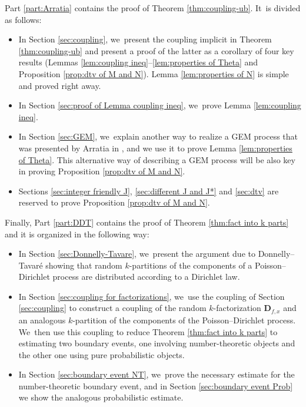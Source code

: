 \documentclass[JEP,XML,SOM,Unicode,published]{cedram}
\newcommand{\bD}{{\boldsymbol D}}
\theoremstyle{plain}
\theoremstyle{definition}
\begin{document}
Part \ref{part:Arratia} contains the proof of Theorem \ref{thm:coupling-ub}. It~is divided as follows:
\begin{itemize}
\item In Section \ref{sec:coupling}, we~present the coupling implicit in Theorem \ref{thm:coupling-ub} and present a proof of the latter as a corollary of four key results (Lemmas \ref{lem:coupling ineq}--\ref{lem:properties of Theta} and Proposition \ref{prop:dtv of M and N}). Lemma \ref{lem:properties of N} is simple and proved right away.

\item In Section \ref{sec:proof of Lemma coupling ineq}, we~prove Lemma \ref{lem:coupling ineq}.

\item In Section \ref{sec:GEM}, we~explain another way to realize a GEM process that was presented by Arratia in \cite{Arratia02}, and we use it to prove Lemma \ref{lem:properties of Theta}. This alternative way of describing a GEM process will be also key in proving Proposition \ref{prop:dtv of M and N}.

\item Sections \ref{sec:integer friendly J}, \ref{sec:different J and J*} and \ref{sec:dtv} are reserved to prove Proposition \ref{prop:dtv of M and N}.
\end{itemize}

Finally, Part \ref{part:DDT} contains the proof of Theorem \ref{thm:fact into k parts} and it is organized in the following way:
\begin{itemize}
\item In Section \ref{sec:Donnelly-Tavare}, we~present the argument due to Donnelly--Tavaré showing that random $k$-partitions of the components of a Poisson--Dirichlet process are distributed according to a Dirichlet law.

\item In Section \ref{sec:coupling for factorizations}, we~use the coupling of Section \ref{sec:coupling} to construct a coupling of the random $k$-factorization $\bD_{f, x}$ and an analogous $k$-partition of the components of the Poisson--Dirichlet process. We~then use this coupling to reduce Theorem \ref{thm:fact into k parts} to estimating two boundary events, one involving number-theoretic objects and the other one using pure probabilistic objects.

\item In Section \ref{sec:boundary event NT}, we~prove the necessary estimate for the number-theoretic boundary event, and in Section \ref{sec:boundary event Prob} we show the analogous probabilistic estimate.
\end{itemize}
\end{document}

